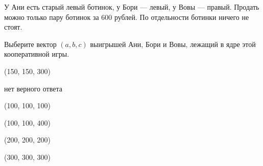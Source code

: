 
\begin{question}
У Ани есть старый левый ботинок, у Бори --- левый, у Вовы --- правый.
Продать можно только пару ботинок за 600 рублей. По отдельности ботинки
ничего не стоят.

Выберите вектор \((a, b, c)\) выигрышей Ани, Бори и Вовы, лежащий в ядре
этой кооперативной игры.
\begin{answerlist}
  \item (150, 150, 300)
  \item нет верного ответа
  \item (100, 100, 100)
  \item (100, 100, 400)
  \item (200, 200, 200)
  \item (300, 300, 300)
\end{answerlist}
\end{question}


